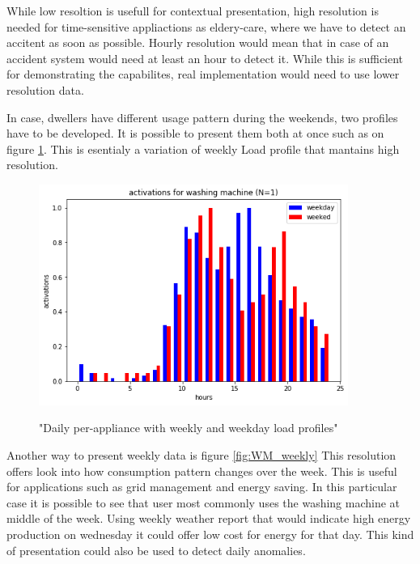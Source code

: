 While low resoltion is usefull for contextual presentation,
high resolution is needed for time-sensitive appliactions as eldery-care,
where we have to detect an accitent as soon as possible.
Hourly resolution would mean that in case of an accident system would need at least an hour to detect it.
While this is sufficient for demonstrating the capabilites, real implementation would need to use lower resolution data.

In case, dwellers have different usage pattern during the weekends, two profiles have to be developed. It is possible 
to present them both at once such as on figure \ref{fig:WM_ww_daily}. This is esentialy a variation of weekly Load
profile that mantains high resolution.

\begin{figure}[H]
	\centering
	\caption{"Daily per-appliance with weekly and weekday load profiles"}
	\includegraphics[width=0.9\textwidth]{../Figures/LPS/WM_ww_daily.png}
	\label{fig:WM_ww_daily}
\end{figure}

Another way to present weekly data is figure \ref{fig:WM_weekly}
This resolution offers look into how consumption pattern changes over
the week. This is useful for applications such as grid management and energy saving.
In this particular case it is possible to see that user most commonly uses the washing machine at middle of the week.
Using weekly weather report that would indicate high energy production on wednesday it could offer low cost for energy for that day. 
This kind of presentation could also be used to detect daily anomalies.

